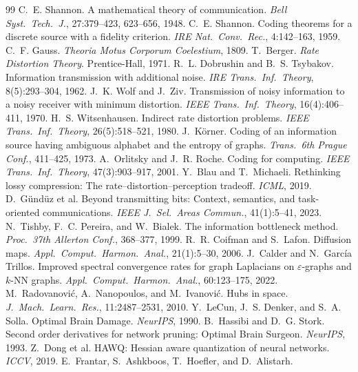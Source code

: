 \documentclass[11pt]{article}
\theoremstyle{definition}
\theoremstyle{remark}
\begin{document}
\begin{thebibliography}{99}
 C.~E. Shannon. A mathematical theory of communication.
\emph{Bell Syst.\ Tech.\ J.}, 27:379--423, 623--656, 1948.
 C.~E. Shannon. Coding theorems for a discrete source with a
fidelity criterion. \emph{IRE Nat.\ Conv.\ Rec.}, 4:142--163, 1959.
 C.~F. Gauss. \emph{Theoria Motus Corporum Coelestium}, 1809.
 T.~Berger. \emph{Rate Distortion Theory}. Prentice-Hall, 1971.
 R.~L. Dobrushin and B.~S. Tsybakov. Information transmission
with additional noise. \emph{IRE Trans.\ Inf.\ Theory}, 8(5):293--304, 1962.
 J.~K. Wolf and J.~Ziv. Transmission of noisy information to a
noisy receiver with minimum distortion. \emph{IEEE Trans.\ Inf.\ Theory},
16(4):406--411, 1970.
 H.~S. Witsenhausen. Indirect rate distortion problems.
\emph{IEEE Trans.\ Inf.\ Theory}, 26(5):518--521, 1980.
 J.~K\"orner. Coding of an information source having ambiguous
alphabet and the entropy of graphs. \emph{Trans.\ 6th Prague Conf.}, 411--425, 1973.
 A.~Orlitsky and J.~R. Roche. Coding for computing.
\emph{IEEE Trans.\ Inf.\ Theory}, 47(3):903--917, 2001.
 Y.~Blau and T.~Michaeli. Rethinking lossy compression: The
rate--distortion--perception tradeoff. \emph{ICML}, 2019.
 D.~G\"und\"uz et al. Beyond transmitting bits: Context,
semantics, and task-oriented communications. \emph{IEEE J.\ Sel.\ Areas Commun.},
41(1):5--41, 2023.
 N.~Tishby, F.~C. Pereira, and W.~Bialek. The information
bottleneck method. \emph{Proc.\ 37th Allerton Conf.}, 368--377, 1999.
 R.~R. Coifman and S.~Lafon. Diffusion maps. \emph{Appl.\
Comput.\ Harmon.\ Anal.}, 21(1):5--30, 2006.
 J.~Calder and N.~Garc\'ia Trillos. Improved spectral
convergence rates for graph Laplacians on $\varepsilon$-graphs and $k$-NN graphs.
\emph{Appl.\ Comput.\ Harmon.\ Anal.}, 60:123--175, 2022.
 M.~Radovanovi\'c, A.~Nanopoulos, and M.~Ivanovi\'c. Hubs in
space. \emph{J.\ Mach.\ Learn.\ Res.}, 11:2487--2531, 2010.
 Y.~LeCun, J.~S. Denker, and S.~A. Solla. Optimal Brain Damage.
\emph{NeurIPS}, 1990.
 B.~Hassibi and D.~G. Stork. Second order derivatives for
network pruning: Optimal Brain Surgeon. \emph{NeurIPS}, 1993.
 Z.~Dong et al. HAWQ: Hessian aware quantization of neural
networks. \emph{ICCV}, 2019.
 E.~Frantar, S.~Ashkboos, T.~Hoefler, and D.~Alistarh.

\end{thebibliography}
\end{document}
